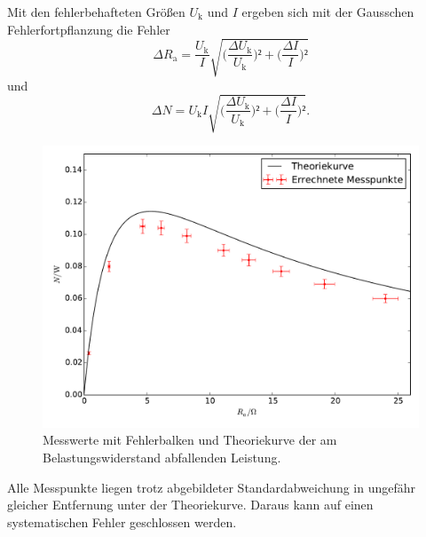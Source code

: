 Mit den fehlerbehafteten Größen $U_\mathup{k}$ und $I$ ergeben sich mit der Gausschen Fehlerfortpflanzung die Fehler
\begin{equation}
\Delta{R_\mathup{a}}=\frac{U_\mathup{k}}{I}
\sqrt{\biggl(\frac{\Delta{U_\mathup{k}}}{U_\mathup{k}}\biggr)²+\biggl(\frac{\Delta{I}}{I}\biggr)²}
\end{equation}
und
\begin{equation}
\Delta{N}=U_\mathup{k}I\sqrt{\biggl(\frac{\Delta{U_\mathup{k}}}{U_\mathup{k}}\biggr)²+\biggl(\frac{\Delta{I}}{I}\biggr)²}.
\end{equation}
\begin{figure}[h]
	\centering
	\includegraphics[width=\textwidth]{content/plot_L.pdf}
	\caption{Messwerte mit Fehlerbalken und Theoriekurve der am Belastungswiderstand abfallenden Leistung.}
\label{fig:N}
\end{figure}

Alle Messpunkte liegen trotz abgebildeter Standardabweichung in ungefähr gleicher Entfernung unter der Theoriekurve. Daraus kann auf einen systematischen Fehler geschlossen werden.
